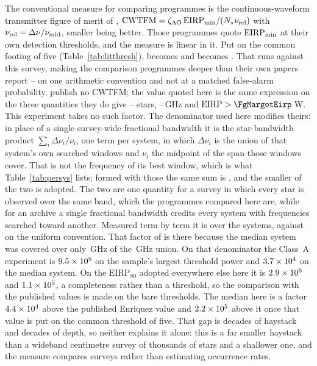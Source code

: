 The conventional measure for comparing programmes is the continuous-waveform
transmitter figure of merit of \citet{Enriquez2017},
$\mathrm{CWTFM}=\zeta_{\rm AO}\,\mathrm{EIRP}_{\rm min}/
(N_{\star}\nu_{\rm rel})$ with $\nu_{\rm rel}=\Delta\nu/\nu_{\rm mid}$,
smaller being better. Those programmes quote $\mathrm{EIRP}_{\rm min}$ at their own detection
thresholds, and the measure is linear in it. Put on the common footing of
five (Table~\ref{tab:litthresh}), \FomLitEnriquez{} becomes
\FomLitEnriquezFive{} and \FgLitMargot{} becomes \FgLitMargotFive. That runs
against this survey, making the comparison programmes deeper than their own
papers report -- on one arithmetic convention and not
at a matched false-alarm probability. \citet{Margot2023} publish no
CWTFM; the value quoted here is the same expression on the three quantities
they do give -- \FomMargotN{} stars, \FomMargotLo--\FomMargotHi\,GHz and
$\mathrm{EIRP}>\FgMargotEirp$\,W. This experiment takes no such factor. The
denominator used here modifies theirs: in place of a single survey-wide
fractional bandwidth it is the star-bandwidth product
$\sum_{i}\Delta\nu_{i}/\nu_{i}$, one term per system, in which
$\Delta\nu_{i}$ is the union of that system's own searched windows and
$\nu_{i}$ the midpoint of the span those windows cover. That is not the frequency of its best window, which is
what Table~\ref{tab:persys} lists; formed with those the same sum is
\CwSigmaBest, and the smaller of the two is adopted. The two are one quantity
for a survey in which every star is observed over the same band, which the
programmes compared here are, while for an archive a single fractional
bandwidth credits every system with frequencies searched toward another. Measured term by term it is \CwSigma{} over the \CwNSys{} systems, against
\CwUniform{} on the uniform convention. That factor of \CwRatio{} is there
because the median system was covered over only \SysUnionAMed\,GHz of the
\CvUnionA\,GHz union. On that denominator the Class~A experiment is
$9.5\times10^{5}$ on the sample's largest threshold power and $3.7\times10^{4}$ on
the median system. On the $\mathrm{EIRP}_{90}$ adopted everywhere else here
it is $2.9\times10^{6}$ and $1.1\times10^{5}$, a completeness rather than a
threshold, so the comparison with the published values is made on the bare
thresholds. The median here is a factor $4.4\times10^{4}$ above the
published Enriquez value and $2.2\times10^{5}$ above it once that value
is put on the common threshold of five. That
gap is \CwBandDex{} decades of haystack and \CwEirpDex{} decades of depth, so
neither explains it alone: this is a far smaller haystack than a wideband
centimetre survey of thousands of stars and a shallower one, and the measure
compares surveys rather than estimating occurrence rates.

